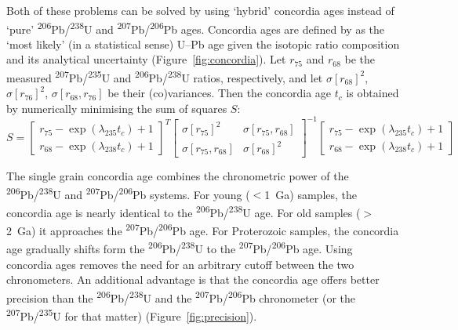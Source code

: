 \documentclass[gchron, manuscript]{copernicus}
\begin{document}
Both of these problems can be solved by using `hybrid' concordia ages
instead of `pure' \textsuperscript{206}Pb/\textsuperscript{238}U and
\textsuperscript{207}Pb/\textsuperscript{206}Pb ages. Concordia ages
are defined by \citet{ludwig1998} as the `most likely' (in a
statistical sense) U--Pb age given the isotopic ratio composition and
its analytical uncertainty (Figure~\ref{fig:concordia}).  Let $r_{75}$
and $r_{68}$ be the measured
\textsuperscript{207}Pb/\textsuperscript{235}U and
\textsuperscript{206}Pb/\textsuperscript{238}U ratios, respectively,
and let $\sigma[r_{68}]^2$, $\sigma[r_{76}]^2$,
$\sigma[r_{68},r_{76}]$ be their (co)variances.  Then the concordia
age $t_c$ is obtained by numerically minimising the sum of squares
$S$:
\begin{equation}
  S = \left[
    \begin{array}{c}
      r_{75} - \exp(\lambda_{235}t_c) + 1 \\
      r_{68} - \exp(\lambda_{238}t_c) + 1
    \end{array}
    \right]^T\left[
    \begin{array}{cc}
      \sigma[r_{75}]^2 & \sigma[r_{75},r_{68}] \\
      \sigma[r_{75},r_{68}] & \sigma[r_{68}]^2
    \end{array}
    \right]^{-1}
  \left[
    \begin{array}{c}
      r_{75} - \exp(\lambda_{235}t_c) + 1 \\
      r_{68} - \exp(\lambda_{238}t_c) + 1      
    \end{array}
    \right]
  \label{eq:S}
\end{equation}

The single grain concordia age combines the chronometric power of the
\textsuperscript{206}Pb/\textsuperscript{238}U and
\textsuperscript{207}Pb/\textsuperscript{206}Pb systems. For young
($<$1~Ga) samples, the concordia age is nearly identical to the
\textsuperscript{206}Pb/\textsuperscript{238}U age. For old samples
($>$2~Ga) it approaches the
\textsuperscript{207}Pb/\textsuperscript{206}Pb age. For Proterozoic
samples, the concordia age gradually shifts form the
\textsuperscript{206}Pb/\textsuperscript{238}U to the
\textsuperscript{207}Pb/\textsuperscript{206}Pb age. Using concordia
ages removes the need for an arbitrary cutoff between the two
chronometers. An additional advantage is that the concordia age offers
better precision than the
\textsuperscript{206}Pb/\textsuperscript{238}U and the
\textsuperscript{207}Pb/\textsuperscript{206}Pb chronometer (or the
\textsuperscript{207}Pb/\textsuperscript{235}U for that matter)
(Figure~\ref{fig:precision}).
\end{document}

